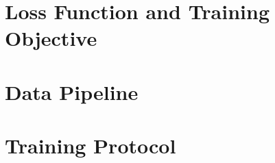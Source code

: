 \documentclass[11pt,a4paper]{article}
\begin{document}









\section{Loss Function and Training Objective}
\label{sec:loss}










\section{Data Pipeline}
\label{sec:data}










\section{Training Protocol}
\label{sec:training}










\end{document}
